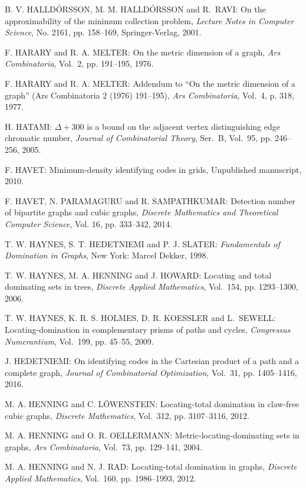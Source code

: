 \begin{thebibliography}{999}
B. V. HALLD\'ORSSON, M. M. HALLD\'ORSSON and R.~RAVI: On the approximability of the minimum collection problem, {\it Lecture Notes in Computer Science}, No. 2161, pp. 158--169, Springer-Verlag, 2001.

F. HARARY and R. A. MELTER: On the metric dimension of a graph, {\it Ars Combinatoria}, Vol.~2, pp. 191--195, 1976.

F. HARARY and R. A. MELTER: Addendum to ``On the metric dimension of a graph'' (Ars Combinatoria 2 (1976) 191--195), {\it Ars Combinatoria}, Vol.~4, p. 318, 1977.

H. HATAMI: $\Delta +300$ is a bound on the adjacent vertex distinguishing edge chromatic number, {\it Journal of Combinatorial Theory}, Ser.~B, Vol.~95, pp. 246--256, 2005.

F. HAVET: Minimum-density identifying codes in grids, Unpublished manuscript, 2010.

F. HAVET, N. PARAMAGURU and R. SAMPATHKUMAR: Detection number of bipartite graphs and cubic graphs, {\it Discrete Mathematics and Theoretical Computer Science}, Vol. 16, pp. 333--342, 2014.

T. W. HAYNES, S. T. HEDETNIEMI and P. J. SLATER: {\it Fundamentals of Domination in Graphs}, New York: Marcel Dekker, 1998.

T. W. HAYNES, M. A. HENNING and J. HOWARD: Locating and total dominating sets in trees, {\it Discrete Applied Mathematics}, Vol.~154, pp. 1293--1300, 2006.

T. W. HAYNES, K. R. S. HOLMES, D. R. KOESSLER and L.~SEWELL: Locating-domination in complementary prisms of paths and cycles, {\it Congressus Numerantium}, Vol.~199, pp. 45--55, 2009.

J. HEDETNIEMI: On identifying codes in the Cartesian product of a path and a complete graph, {\it Journal of Combinatorial Optimization}, Vol.~31, pp. 1405--1416, 2016.

M. A. HENNING and C. L\"{O}WENSTEIN: Locating-total domination in claw-free cubic graphs, {\it Discrete Mathematics}, Vol.~312, pp. 3107--3116, 2012.

M. A. HENNING and O. R. OELLERMANN: Metric-locating-dominating sets in graphs, {\it Ars Combinatoria}, Vol.~73, pp. 129--141, 2004.

M. A. HENNING and N. J. RAD: Locating-total domination in graphs, {\it Discrete Applied Mathematics}, Vol.~160, pp. 1986--1993, 2012.


\end{thebibliography}
